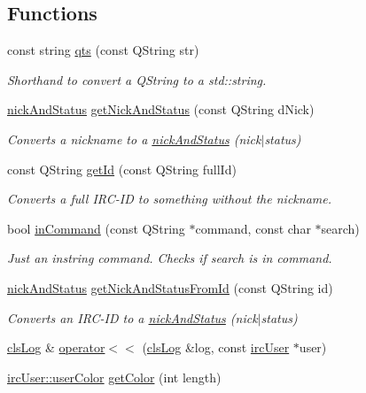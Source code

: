 \subsection*{Functions}
\begin{DoxyCompactItemize}
\item 
const string \hyperlink{namespaceserver_a5975bac26af821c5aa25ca3b66ab35a9}{qts} (const Q\-String str)
\begin{DoxyCompactList}\small\item\em Shorthand to convert a Q\-String to a std\-::string. \end{DoxyCompactList}\item 
\hyperlink{structserver_1_1nick_and_status}{nick\-And\-Status} \hyperlink{namespaceserver_abefc8e9cd145a8a00676c9bf43b877ef}{get\-Nick\-And\-Status} (const Q\-String d\-Nick)
\begin{DoxyCompactList}\small\item\em Converts a nickname to a \hyperlink{structserver_1_1nick_and_status}{nick\-And\-Status} (nick$|$status) \end{DoxyCompactList}\item 
const Q\-String \hyperlink{namespaceserver_ad244a00644a29a6c927a6ee9dd351351}{get\-Id} (const Q\-String full\-Id)
\begin{DoxyCompactList}\small\item\em Converts a full I\-R\-C-\/\-I\-D to something without the nickname. \end{DoxyCompactList}\item 
bool \hyperlink{namespaceserver_ab14f85d7268f4938433c3bd76aefd61e}{in\-Command} (const Q\-String $\ast$command, const char $\ast$search)
\begin{DoxyCompactList}\small\item\em Just an instring command. Checks if search is in command. \end{DoxyCompactList}\item 
\hyperlink{structserver_1_1nick_and_status}{nick\-And\-Status} \hyperlink{namespaceserver_a4ab136076f9a5f1ae8a6d78020f07c07}{get\-Nick\-And\-Status\-From\-Id} (const Q\-String id)
\begin{DoxyCompactList}\small\item\em Converts an I\-R\-C-\/\-I\-D to a \hyperlink{structserver_1_1nick_and_status}{nick\-And\-Status} (nick$|$status) \end{DoxyCompactList}\item 
\hyperlink{class_k4_u_1_1cls_log}{cls\-Log} \& \hyperlink{namespaceserver_aa5c4f8737f00b4b33cca775c3d85c1f8}{operator$<$$<$} (\hyperlink{class_k4_u_1_1cls_log}{cls\-Log} \&log, const \hyperlink{classserver_1_1irc_user}{irc\-User} $\ast$user)
\item 
\hyperlink{structserver_1_1irc_user_1_1user_color}{irc\-User\-::user\-Color} \hyperlink{namespaceserver_a2a6ca6577f352c7d095faf91c8e8dd5a}{get\-Color} (int length)
\end{DoxyCompactItemize}


